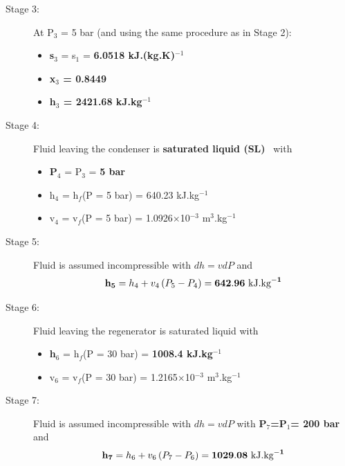 \documentclass[calculator,steamtables,refrigeranttables,psychrometricchart,datasheet,resit]{exam}
\begin{document}
\begin{question}
\begin{enumerate}[(a)]
{\begin{description}
\item[Stage 3:] At P$_{3}$ = 5 bar (and using the same procedure as in Stage 2):
\begin{itemize}
\item {\bf s$_{3}$} = s$_{1}$ = {\bf 6.0518 kJ.(kg.K)$^{-1}$}~
\item {\bf x$_{3}$ = 0.8449}~
\item {\bf h$_{3}$ = 2421.68 kJ.kg$^{-1}$}~ 
\end{itemize}

\item[Stage 4:] Fluid leaving the condenser is {\bf saturated liquid (SL)}~ with
\begin{itemize}
\item {\bf P$_{4}$} = P$_{3}$ = {\bf 5 bar}~
\item h$_{4}$ = h$_{f}$(P = 5 bar) =  640.23 kJ.kg$^{-1}$
\item v$_{4}$ = v$_{f}$(P = 5 bar) = 1.0926$\times$10$^{-3}$ m$^{3}$.kg$^{-1}$
\end{itemize}

\item[Stage 5:] Fluid is assumed incompressible with $dh = vdP$ and~
\begin{displaymath}
{\bf h_{5}} = h_{4} + v_{4}\left(P_{5}-P_{4}\right) = {\bf 642.96 \text{ kJ.kg}^{-1}}
\end{displaymath}

\item[Stage 6:]  Fluid leaving the regenerator is saturated liquid with
\begin{itemize}
\item {\bf h$_{6}$} = h$_{f}$(P = 30 bar) =  {\bf 1008.4 kJ.kg$^{-1}$}~
\item v$_{6}$ = v$_{f}$(P = 30 bar) = 1.2165$\times$10$^{-3}$ m$^{3}$.kg$^{-1}$
\end{itemize}


\item[Stage 7:]  Fluid is assumed incompressible with $dh = vdP$ with {\bf P$_{7}$=P$_{1}$= 200 bar}~ and
\begin{displaymath}
{\bf h_{7}} = h_{6} + v_{6}\left(P_{7}-P_{6}\right) = {\bf 1029.08 \text{ kJ.kg}^{-1}}
\end{displaymath}~
\end{description}

}
\end{enumerate}
\end{question}
\end{document}
